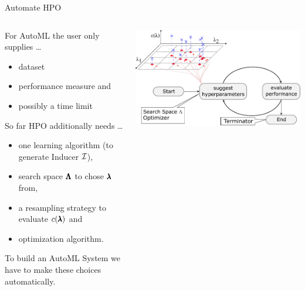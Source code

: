 \begin{frame}{Automate HPO}

  \begin{columns}
    \begin{column}{0.59\textwidth}

      For AutoML the user only supplies \ldots
      \begin{itemize}
        \item dataset
        \item performance measure and
        \item possibly a time limit
      \end{itemize}

      So far HPO additionally needs \ldots
      \begin{itemize}
        \item one learning algorithm (to generate Inducer $\mathcal{I}$),
        \item search space $\pmb{\Lambda}$ to chose $\pmb{\lambda}$ from,
        \item a resampling strategy to evaluate $c(\pmb{\lambda})$ and
        \item optimization algorithm.
      \end{itemize}

      To build an AutoML System we have to make these choices automatically.

    \end{column}%
    \begin{column}{0.4\textwidth}
      \begin{center}
        \includegraphics[width = \linewidth]{images/tuning.pdf}    
      \end{center}
    \end{column}
  \end{columns}

\end{frame}

